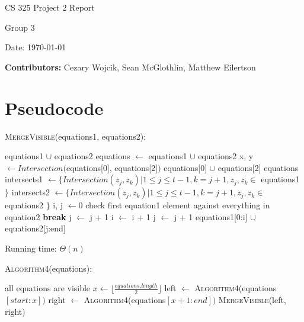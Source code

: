 \documentclass[12pt,letterpaper]{article}
\begin{document}
\begin{titlepage}
    \vspace*{4cm}
    {\huge \center
        CS 325 Project 2 Report\\[1cm]
    }
    \center
    {\large
        Group 3

        Date: \today

    \textbf{Contributors:}
    Cezary Wojcik,
    Sean McGlothlin,
    Matthew Eilertson
    }

\end{titlepage}


\section{Pseudocode}

\textsc{MergeVisible}(equations1, equations2):

\begin{algorithmic}
	\State \Return equations1 $\cup$ equations2
\EndIf
{}
	\State equations $\gets$ equations1 $\cup$ equations2
	\State x, y $\gets Intersection($equations[0], equations[2]$)$
		\State \Return equations[0] $\cup$ equations[2]
	\Else
		\State \Return equations
	\EndIf
\EndIf
\State intersects1 $\gets \{ Intersection(z_j, z_k) | 1 \leq j \leq t - 1, k = j + 1, z_j,z_k \in$ equations1 $\}$
\State intersects2 $\gets \{ Intersection(z_j, z_k) | 1 \leq j \leq t - 1, k = j + 1, z_j,z_k \in$ equations2 $\}$
\State i, j $\gets 0$
\State check first equation1 element against everything in equation2
		\State \textbf{break}
		\State j $\gets$ j + 1
		\State i $\gets$ i + 1
	\Else
		\State j $\gets$ j + 1
	\EndIf
\EndWhile
\State \Return equations1[0:i] $\cup$ equations2[j:end]
\end{algorithmic}

Running time: $\Theta(n)$

\textsc{Algorithm4}(equations):

\begin{algorithmic}
	\State all equations are visible
\Else
	\State $x \gets \lfloor\frac{equations.length}{2}\rfloor$
	\State left $\gets$ \textsc{Algorithm4}(equations$[start:x])$
	\State right $\gets$ \textsc{Algorithm4}(equations$[x+1:end])$
	\State \Return \textsc{MergeVisible}(left, right)
\EndIf
\end{algorithmic}
\end{document}
